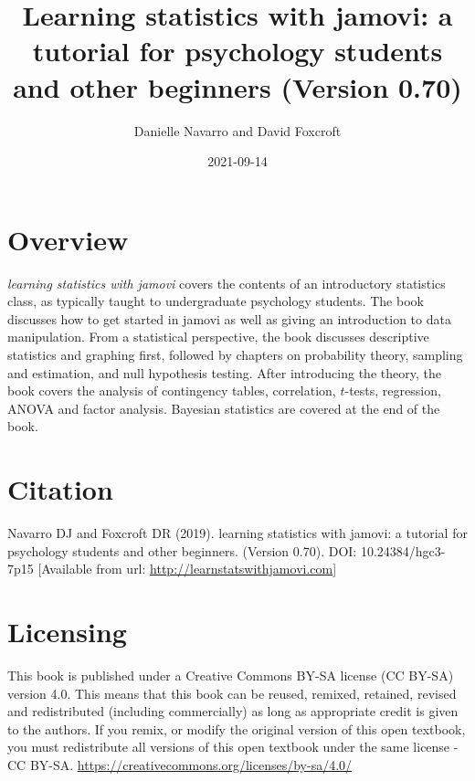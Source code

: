 \documentclass[
]{book}
\title{Learning statistics with jamovi: a tutorial for psychology students and other beginners (Version 0.70)}
\author{Danielle Navarro and David Foxcroft}
\date{2021-09-14}
\begin{document}
\maketitle

{
\setcounter{tocdepth}{1}
\tableofcontents
}
\hypertarget{overview}{%
\chapter*{Overview}\label{overview}}

\emph{learning statistics with jamovi} covers the contents of an introductory statistics class, as typically taught to undergraduate psychology students. The book discusses how to get started in jamovi as well as giving an introduction to data manipulation. From a statistical perspective, the book discusses descriptive statistics and graphing first, followed by chapters on probability theory, sampling and estimation, and null hypothesis testing. After introducing the theory, the book covers the analysis of contingency tables, correlation, \(t\)-tests, regression, ANOVA and factor analysis. Bayesian statistics are covered at the end of the book.

\hypertarget{citation}{%
\chapter*{Citation}\label{citation}}

Navarro DJ and Foxcroft DR (2019). learning statistics with jamovi: a tutorial for psychology students and other beginners. (Version 0.70). DOI: 10.24384/hgc3-7p15 {[}Available from url: \url{http://learnstatswithjamovi.com}{]}

\hypertarget{licensing}{%
\chapter*{Licensing}\label{licensing}}

This book is published under a Creative Commons BY-SA license (CC BY-SA) version 4.0. This means that this book can be reused, remixed, retained, revised and redistributed (including commercially) as long as appropriate credit is given to the authors. If you remix, or modify the original version of this open textbook, you must redistribute all versions of this open textbook under the same license - CC BY-SA. \url{https://creativecommons.org/licenses/by-sa/4.0/}
\end{document}
